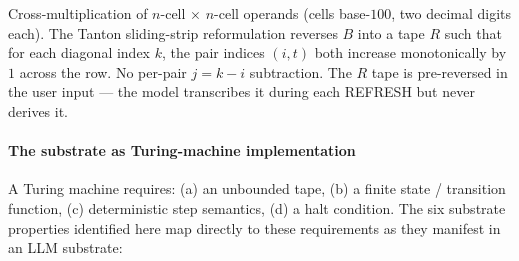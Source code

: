 \documentclass[twocolumn,switch,10pt]{article}
\begin{document}
Cross-multiplication of \(n\)-cell \(\times\) \(n\)-cell operands (cells
base-\(100\), two decimal digits each). The Tanton sliding-strip
reformulation reverses \(B\) into a tape \(R\) such that for each diagonal
index \(k\), the pair indices \((i, t)\) both increase monotonically by
\(1\) across the row. No per-pair \(j = k - i\) subtraction. The \(R\) tape
is pre-reversed in the user input --- the model transcribes it during
each REFRESH but never derives it.

\paragraph{The substrate as Turing-machine implementation}\label{the-substrate-as-turing-machine-implementation}

A Turing machine requires: (a) an unbounded tape, (b) a finite state /
transition function, (c) deterministic step semantics, (d) a halt
condition. The six substrate properties identified here map directly
to these requirements as they manifest in an LLM substrate:
\end{document}
